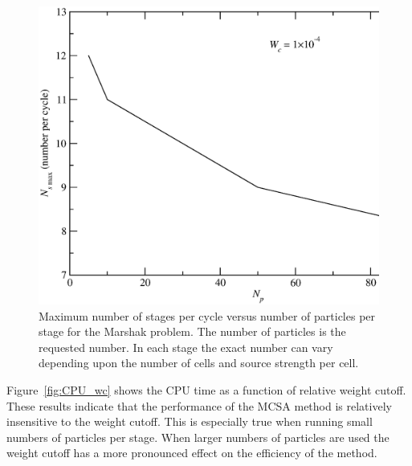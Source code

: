 \documentclass[preprint,12pt]{elsarticle}
\begin{document}
\begin{figure}[htpb!]
  \centerline{
    \includegraphics[width=5in,clip]{mrshk_np_Ns.eps}}
  \caption{
    Maximum number of stages per cycle versus number of particles per
    stage for the Marshak problem.  The number of particles is the
    requested number.  In each stage the exact number can vary
    depending upon the number of cells and source strength per cell.}
  \label{fig:CPU_Ns}
\end{figure}

Figure~\ref{fig:CPU_wc} shows the CPU time as a function of relative
weight cutoff.  These results indicate that the performance of the
MCSA method is relatively insensitive to the weight cutoff.  This is
especially true when running small numbers of particles per stage.
When larger numbers of particles are used the weight cutoff has a more
pronounced effect on the efficiency of the method.
\end{document}
